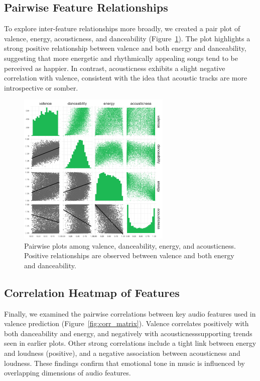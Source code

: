 \documentclass[a4paper,11pt]{article}
\begin{document}
\subsection{Pairwise Feature Relationships}
To explore inter-feature relationships more broadly, we created a pair plot of valence, energy, acousticness, and danceability (Figure~\ref{fig:pairplot}). The plot highlights a strong positive relationship between valence and both energy and danceability, suggesting that more energetic and rhythmically appealing songs tend to be perceived as happier. In contrast, acousticness exhibits a slight negative correlation with valence, consistent with the idea that acoustic tracks are more introspective or somber.

\begin{figure}[h]
\centering
\includegraphics[width=0.65\textwidth]{Figure4-pairplot-valence.png}
\caption{Pairwise plots among valence, danceability, energy, and acousticness. Positive relationships are observed between valence and both energy and danceability.}
\label{fig:pairplot}
\end{figure}

\subsection{Correlation Heatmap of Features}
Finally, we examined the pairwise correlations between key audio features used in valence prediction (Figure~\ref{fig:corr_matrix}). Valence correlates positively with both danceability and energy, and negatively with acousticness\textemdash supporting trends seen in earlier plots. Other strong correlations include a tight link between energy and loudness (positive), and a negative association between acousticness and loudness. These findings confirm that emotional tone in music is influenced by overlapping dimensions of audio features.
\end{document}
